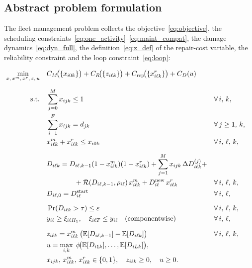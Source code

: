 \documentclass[11pt,a4paper]{article}
\theoremstyle{plain}
\theoremstyle{definition}
\theoremstyle{remark}
\begin{document}
\subsection{Abstract problem formulation}

The fleet management problem collects the objective~\eqref{eq:objective}, the scheduling constraints~\eqref{eq:one_activity}--\eqref{eq:maint_compat}, the damage dynamics~\eqref{eq:dyn_full}, the definition~\eqref{eq:z_def} of the repair-cost variable, the reliability constraint and the loop constraint~\eqref{eq:loop}:

\begin{subequations}\label{eq:abstract}
\begin{align}
\min_{x,\,x^m,\,x^r,\,z,\,u} \quad
  & C_M\!\bigl(\{x_{i0k}\}\bigr)
    + C_R\!\bigl(\{z_{i\ell k}\}\bigr)
    + C_{\mathrm{rep}}\!\bigl(\{x^r_{i\ell k}\}\bigr)
    + C_D(u)
    \label{eq:abs_obj} \\[6pt]
%
\text{s.t.} \quad
  & \sum_{j=0}^{M} x_{ijk} \le 1
    && \forall\, i,\,k,
    \label{eq:abs_assign} \\
  & \sum_{i=1}^{F} x_{ijk} = d_{jk}
    && \forall\, j \ge 1,\,k,
    \label{eq:abs_cover} \\
  & x^m_{i\ell k} + x^r_{i\ell k} \le x_{i0k}
    && \forall\, i,\,\ell,\,k,
    \label{eq:abs_maint} \\[6pt]
%
  & D_{i\ell k} = D_{i\ell,k-1}(1-x^m_{i\ell k})(1-x^r_{i\ell k})
    + \sum_{j=1}^{M} x_{ijk}\,\Delta D_{i\ell k}^{(j)} + \notag \\
  & \qquad\qquad + \mathcal{R}(D_{i\ell,k-1},\rho_{i\ell})\,x^m_{i\ell k}
    + D^{\mathrm{new}}_{i\ell}\,x^r_{i\ell k}
    && \forall\, i,\,\ell,\,k,
    \label{eq:abs_dyn} \\
  & D_{i\ell,0} = D^{\mathrm{start}}_{i\ell}
    && \forall\, i,\,\ell,
    \label{eq:abs_init} \\[6pt]
%
  & \Pr(D_{i\ell k} > \tau) \le \varepsilon
    && \forall\, i,\,\ell,\,k,
    \label{eq:abs_rel} \\
  & y_{i\ell} \ge \xi_{i\ell H_1}, \quad \xi_{i\ell T} \le y_{i\ell} \quad \text{(componentwise)}
    && \forall\, i,\,\ell,
    \label{eq:abs_loop} \\[6pt]
%
  & z_{i\ell k} = x^m_{i\ell k}\,\bigl(\mathbb{E}[D_{i\ell,k-1}] - \mathbb{E}[D_{i\ell k}]\bigr)
    && \forall\, i,\,\ell,\,k,
    \label{eq:abs_z} \\
  & u = \max_{i,k}\;\phi\!\bigl(\mathbb{E}[D_{i1k}],\ldots,\mathbb{E}[D_{iLk}]\bigr),
    \label{eq:abs_u} \\
  & x_{ijk},\, x^m_{i\ell k},\, x^r_{i\ell k} \in \{0,1\},\quad
    z_{i\ell k} \ge 0,\quad u \ge 0.
    \label{eq:abs_domain}
\end{align}
\end{subequations}
\end{document}
